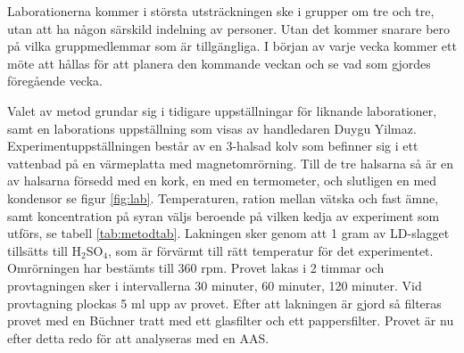\documentclass{article}
\begin{document}
Laborationerna kommer i största utsträckningen ske i grupper om tre och tre, utan att ha någon särskild indelning av personer. Utan det kommer snarare bero på vilka gruppmedlemmar som är tillgängliga. I början av varje vecka kommer ett möte att hållas för att planera den kommande veckan och se vad som gjordes föregående vecka. 

Valet av metod grundar sig i tidigare uppställningar för liknande laborationer, samt en laborations uppställning som visas av handledaren Duygu Yilmaz\cite{Aarabi-Karasgani2010}. Experimentuppställningen består av en 3-halsad kolv som befinner sig i ett vattenbad på en värmeplatta med magnetomrörning. Till de tre halsarna så är en av halsarna försedd med en kork, en med en termometer, och slutligen en med kondensor se figur \ref{fig:lab}. Temperaturen, ration mellan vätska och fast ämne, samt koncentration på syran väljs beroende på vilken kedja av experiment som utförs, se tabell \ref{tab:metodtab}. Lakningen sker genom att 1 gram av LD-slagget tillsätts till H$_{2}$SO$_{4}$, som är förvärmt till rätt temperatur för det experimentet. Omrörningen har bestämts till 360 rpm. Provet lakas i 2 timmar och provtagningen sker i intervallerna 30 minuter, 60 minuter, 120 minuter. Vid provtagning plockas 5 ml upp av provet. Efter att lakningen är gjord så filteras provet med en Büchner tratt med ett glasfilter och ett pappersfilter. Provet är nu efter detta redo för att analyseras med en AAS. 
\end{document}
